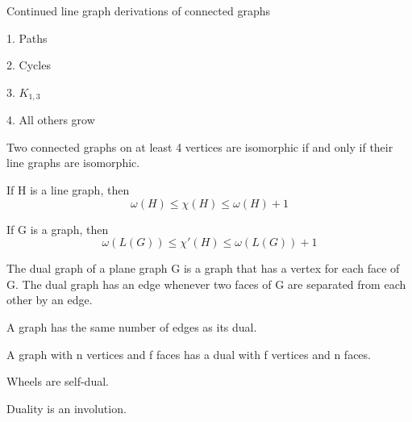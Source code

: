 Continued line graph derivations of connected graphs

    1.  Paths

    2.  Cycles

    3.  $K_{1,3}$

    4.  All others grow

\begin{theorem}
    Two connected graphs on at least 4 vertices are isomorphic if and only if their line graphs are isomorphic.
\end{theorem}


\begin{proposition}
    If H is a line graph, then 
    \[
        \omega(H)\leq \chi(H) \leq\omega(H)+1
    \]
\end{proposition}

\begin{proposition}
    If G is a graph, then
    \[
        \omega(L(G))\leq\chi'(H)\leq\omega(L(G))+1
    \]
\end{proposition}



\begin{definition}
    The dual graph of a plane graph G is a graph that has a vertex for each face of G. The dual graph has an edge whenever two faces of G are separated from each other by an edge.
\end{definition}

\begin{theorem}
A graph has the same number of edges as its dual.
\end{theorem}

\begin{theorem}
A graph with n vertices and f faces has a dual with f vertices and n faces.
\end{theorem}

\begin{proposition}
    Wheels are self-dual.
\end{proposition}

\begin{proposition}
    Duality is an involution.
\end{proposition}
